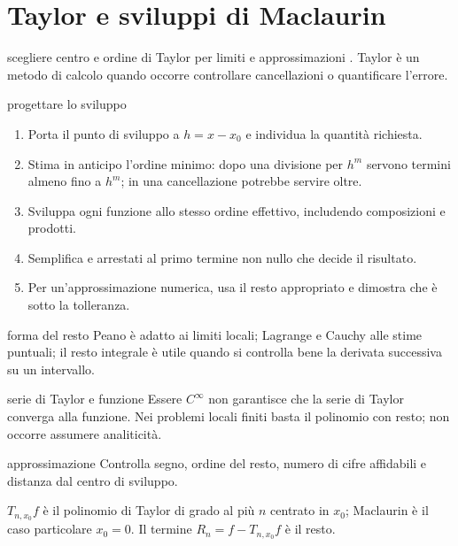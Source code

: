 \chapter{Taylor e sviluppi di Maclaurin}
\label{chap:12}

\begin{obiettivocapitolo}{scegliere centro e ordine di Taylor per limiti e approssimazioni}
\prioritaalta. Taylor è un metodo di calcolo quando occorre controllare cancellazioni o quantificare l'errore.
\end{obiettivocapitolo}
\begin{proceduraesame}{progettare lo sviluppo}
\begin{enumerate}
\item Porta il punto di sviluppo a $h=x-x_0$ e individua la quantità richiesta.
\item Stima in anticipo l'ordine minimo: dopo una divisione per $h^m$ servono termini almeno fino a $h^m$; in una cancellazione potrebbe servire oltre.
\item Sviluppa ogni funzione allo stesso ordine effettivo, includendo composizioni e prodotti.
\item Semplifica e arrestati al primo termine non nullo che decide il risultato.
\item Per un'approssimazione numerica, usa il resto appropriato e dimostra che è sotto la tolleranza.
\end{enumerate}
\end{proceduraesame}
\begin{sceltametodo}{forma del resto}
Peano è adatto ai limiti locali; Lagrange e Cauchy alle stime puntuali; il resto integrale è utile quando si controlla bene la derivata successiva su un intervallo.
\end{sceltametodo}
\begin{errorefrequente}{serie di Taylor e funzione}
Essere $C^\infty$ non garantisce che la serie di Taylor converga alla funzione. Nei problemi locali finiti basta il polinomio con resto; non occorre assumere analiticità.
\end{errorefrequente}
\begin{controllofinale}{approssimazione}
Controlla segno, ordine del resto, numero di cifre affidabili e distanza dal centro di sviluppo.
\end{controllofinale}

\(T_{n,x_0}f\) è il polinomio di Taylor di grado al più \(n\) centrato in \(x_0\); Maclaurin è il caso particolare \(x_0=0\). Il termine \(R_n=f-T_{n,x_0}f\) è il resto.

